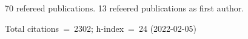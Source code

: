 70 refereed publications. 13 refeered publications as first author.

Total citations~=~2302; h-index~=~24 (2022-02-05)